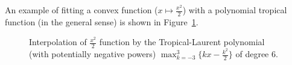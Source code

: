 \documentclass{article} %
\theoremstyle{plain}
\theoremstyle{definition}
\theoremstyle{remark}
\begin{document}
An example of fitting a convex function ($x \mapsto \frac{x^2}{2}$) with a polynomial tropical function (in the general sense) is shown in Figure~\ref{fig:x_squared_tropical}.
\begin{figure}[!htbp]
    \centering
    \caption{Interpolation of $\displaystyle\frac{x^2}{2}$ function by the Tropical-Laurent polynomial (with potentially negative powers) $\displaystyle\max_{k=-3}^{3}\{kx - \frac{k^2}{2}\}$ of degree 6.}
    \label{fig:x_squared_tropical}
\end{figure}
\newpage
\end{document}
